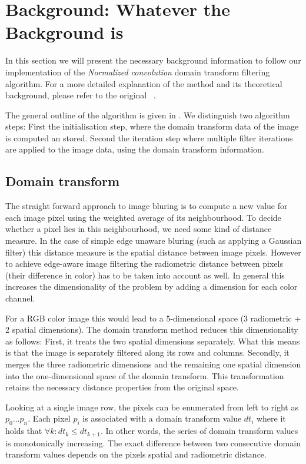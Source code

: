 \section{Background: Whatever the Background is}\label{sec:background}

In this section we will present the necessary background information to follow our implementation of the \textit{Normalized convolution} domain transform filtering algorithm. For a more detailed explanation of the method and its theoretical background, please refer to the original ~\cite{GastalOliveira2011DomainTransform}.

The general outline of the algorithm is given in . We distinguish two algorithm steps: First the initialisation step, where the domain transform data of the image is computed an stored. Second the iteration step where multiple filter iterations are applied to the image data, using the domain transform information.

\subsection{Domain transform}

The straight forward approach to image bluring is to compute a new value for each image pixel using the weighted average of its neighbourhood. To decide whether a pixel lies in this neighbourhood, we need some kind of distance measure. In the case of simple edge unaware bluring (such as applying a Gaussian filter) this distance measure is the spatial distance between image pixels. However to achieve edge-aware image filtering the radiometric distance between pixels (their difference in color) has to be taken into account as well.
In general this increases the dimensionality of the problem by adding a dimension for each color channel.

For a RGB color image this would lead to a 5-dimensional space (3 radiometric + 2 spatial dimensions). The domain transform method reduces this dimensionality as follows:
First, it treats the two spatial dimensions separately. What this means is that the image is separately filtered along its rows and columns. Secondly, it merges the three radiometric dimensions and the remaining one spatial dimension into the one-dimensional space of the domain transform. This transformation retains the necessary distance properties from the original space.

Looking at a single image row, the pixels can be enumerated from left to right as $ p_0 \dots p_n$. Each pixel $p_i$ is associated with a domain transform value $dt_i$ where it holds that $\forall k : dt_k \leq dt_{k+1}$. In other words, the series of domain transform values is monotonically increasing. The exact difference between two consecutive domain transform values depends on the pixels spatial and radiometric distance.

